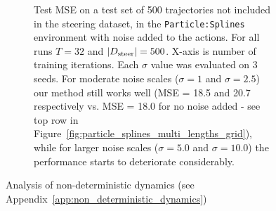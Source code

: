 \documentclass[nohyperref]{article}
\begin{document}
\begin{figure}[]
\begin{subfigure}{0.45\textwidth}
        \caption{Test MSE on a test set of 500 trajectories not included in the steering dataset, in the \texttt{Particle:Splines} environment with noise added to the actions. For all runs $T=32$ and $|D_{\mathrm{steer}}|=500$. X-axis is number of training iterations.  Each $\sigma$ value was evaluated on 3 seeds. For moderate noise scales ($\sigma = 1$ and $\sigma = 2.5$) our method still works well (MSE = 18.5 and 20.7 respectively vs. MSE = 18.0 for no noise added - see top row in Figure~\ref{fig:particle_splines_multi_lengths_grid}), while for larger noise scales ($\sigma = 5.0$ and $\sigma = 10.0$) the performance starts to deteriorate considerably. }
        \label{fig:IT-IN_perf_on_noisy_particle}
    \end{subfigure}
    \caption{Analysis of non-deterministic dynamics (see Appendix~\ref{app:non_deterministic_dynamics}) }
\end{figure}
\end{document}
